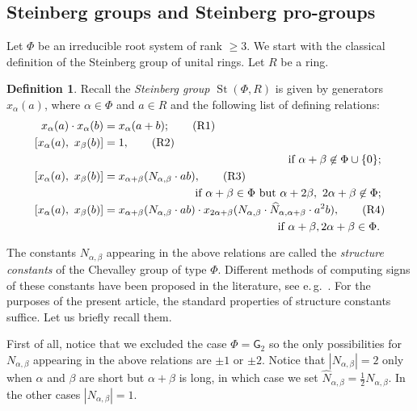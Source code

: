 \documentclass{article}
\numberwithin{equation}{section}
\theoremstyle{definition}
\newtheorem{df}[lemma]{Definition} \Crefname{df}{Definition}{Definitions}
\theoremstyle{remark}
\DeclareMathOperator\St{St}
\begin{document}
\subsection{Steinberg groups and Steinberg pro-groups}
Let $\Phi$ be an irreducible root system of rank $\geq 3$.
We start with the classical definition of the Steinberg group of unital rings.
Let $R$ be a ring.
\begin{df} \label{def:Steinberg}
Recall the {\it Steinberg group $\St(\Phi, R)$} is given by generators $x_\alpha(a)$, where $\alpha \in \Phi$ and $a \in R$ and the following list of defining relations:
\begin{align}
 x_\alpha(a) \cdot x_\alpha(b)    &= x_\alpha(a+b); \tag{R1} \label{R1} \\
 [x_\alpha(a),\ x_\beta(b)] &= 1, \tag{R2} \label{R2} \\ 
 \multispan2{\hfil if $\alpha + \beta \not\in\Phi \cup \{0\};$} \nonumber \\
 [x_\alpha(a),\ x_\beta(b)] &= x_{\alpha + \beta}(N_{\alpha,\beta} \cdot ab), \tag{R3} \label{R3} \\
 \multispan2{\hfill if $\alpha+\beta\in\Phi$ but $\alpha+2\beta,\ 2\alpha+\beta\not\in\Phi;$} \nonumber \\
 [x_\alpha(a),\ x_\beta(b)] &= x_{\alpha + \beta}(N_{\alpha,\beta} \cdot ab) \cdot x_{2\alpha+\beta}(N_{\alpha,\beta} \cdot \widehat{N}_{\alpha, \alpha+\beta}\cdot a^2b), \tag{R4} \label{R4} \\ \multispan2{ \hfill if $\alpha+\beta,2\alpha+\beta\in\Phi$.} \nonumber  \end{align}
\end{df}
The constants $N_{\alpha,\beta}$ appearing in the above relations are called the {\it structure constants} of the Chevalley group of type $\Phi$.
Different methods of computing signs of these constants have been proposed in the literature, see e.\,g.~\cite{VP}.
For the purposes of the present article, the standard properties of structure constants suffice. Let us briefly recall them.

First of all, notice that we excluded the case $\Phi=\mathsf{G}_2$ so the only possibilities for $N_{\alpha, \beta}$ appearing in the above relations are $\pm 1$ or $\pm 2$.
Notice that $|N_{\alpha,\beta}| = 2$ only when $\alpha$ and $\beta$ are short but $\alpha+\beta$ is long, in which case we set $\widehat{N}_{\alpha, \beta} = \frac{1}{2} N_{\alpha, \beta}$.
In the other cases $|N_{\alpha, \beta}| = 1$.
\end{document}
